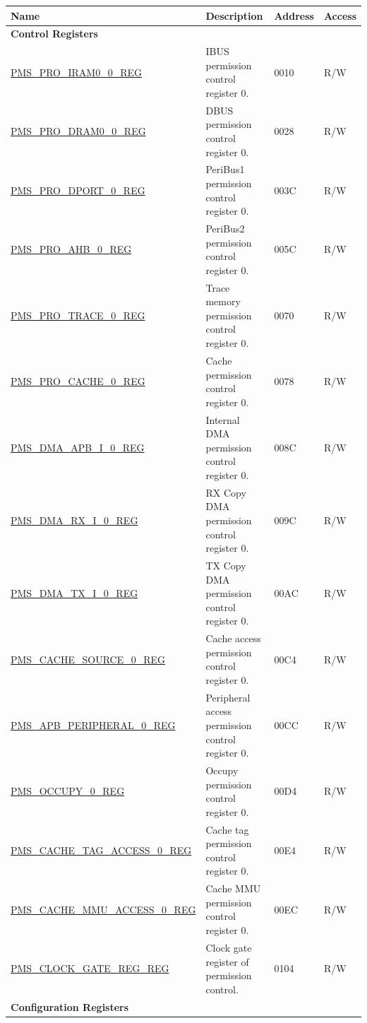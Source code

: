 \begin{longtable}{ |m{6cm} |m{7.2cm} | m{1.3cm} |m{1cm} | }
\hline\rowcolor{lightgray}
Name & Description &  Address & Access \\ \hline
\endhead
\multicolumn{4}{|l|}{\textbf{Control Registers}} \\ \hline

\hyperref[regdesc:PMSPROIRAM00REG]{PMS\_PRO\_IRAM0\_0\_REG} & IBUS permission control register 0. & \hexprefix{}0010 & R/W \\ \hline
\hyperref[regdesc:PMSPRODRAM00REG]{PMS\_PRO\_DRAM0\_0\_REG} & DBUS permission control register 0. & \hexprefix{}0028 & R/W \\ \hline
\hyperref[regdesc:PMSPRODPORT0REG]{PMS\_PRO\_DPORT\_0\_REG} & PeriBus1 permission control register 0. & \hexprefix{}003C & R/W \\ \hline
\hyperref[regdesc:PMSPROAHB0REG]{PMS\_PRO\_AHB\_0\_REG} & PeriBus2 permission control register 0. & \hexprefix{}005C & R/W \\ \hline
\hyperref[regdesc:PMSPROTRACE0REG]{PMS\_PRO\_TRACE\_0\_REG} & Trace memory permission control register 0. & \hexprefix{}0070 & R/W \\ \hline
\hyperref[regdesc:PMSPROCACHE0REG]{PMS\_PRO\_CACHE\_0\_REG} & Cache permission control register 0. & \hexprefix{}0078 & R/W \\ \hline
\hyperref[regdesc:PMSDMAAPBI0REG]{PMS\_DMA\_APB\_I\_0\_REG} & Internal DMA permission control register 0. & \hexprefix{}008C & R/W \\ \hline
\hyperref[regdesc:PMSDMARXI0REG]{PMS\_DMA\_RX\_I\_0\_REG} & RX Copy DMA permission control register 0. & \hexprefix{}009C & R/W \\ \hline
\hyperref[regdesc:PMSDMATXI0REG]{PMS\_DMA\_TX\_I\_0\_REG} & TX Copy DMA permission control register 0. & \hexprefix{}00AC & R/W \\ \hline
\hyperref[regdesc:PMSCACHESOURCE0REG]{PMS\_CACHE\_SOURCE\_0\_REG} & Cache access permission control register 0. & \hexprefix{}00C4 & R/W \\ \hline
\hyperref[regdesc:PMSAPBPERIPHERAL0REG]{PMS\_APB\_PERIPHERAL\_0\_REG} & Peripheral access permission control register 0. & \hexprefix{}00CC & R/W \\ \hline
\hyperref[regdesc:PMSOCCUPY0REG]{PMS\_OCCUPY\_0\_REG} & Occupy permission control register 0. & \hexprefix{}00D4 & R/W \\ \hline
\hyperref[regdesc:PMSCACHETAGACCESS0REG]{PMS\_CACHE\_TAG\_ACCESS\_0\_REG} & Cache tag permission control register 0. & \hexprefix{}00E4 & R/W \\ \hline
\hyperref[regdesc:PMSCACHEMMUACCESS0REG]{PMS\_CACHE\_MMU\_ACCESS\_0\_REG} & Cache MMU permission control register 0. & \hexprefix{}00EC & R/W \\ \hline
\hyperref[regdesc:PMSCLOCKGATEREGREG]{PMS\_CLOCK\_GATE\_REG\_REG} & Clock gate register of permission control. & \hexprefix{}0104 & R/W \\ \hline
\multicolumn{4}{|l|}{\textbf{Configuration Registers}} \\ \hline


\end{longtable}
